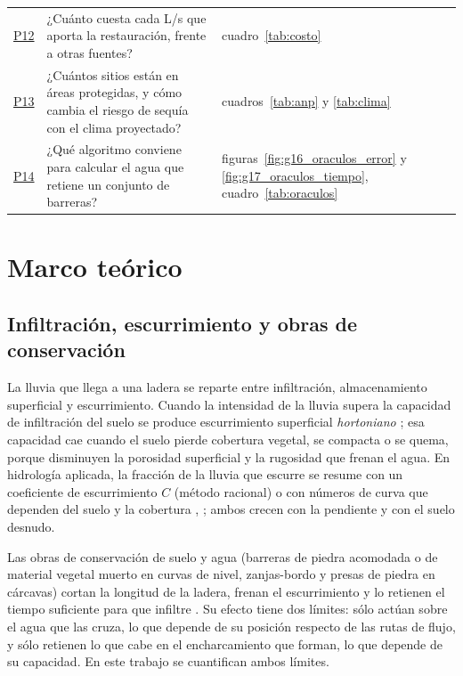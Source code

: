 \begin{table}[H]
\begin{tabularx}{\linewidth}{lXl}
\hyperref[res:p12]{P12} & ¿Cuánto cuesta cada L/s que aporta la restauración, frente a otras fuentes? & cuadro~\ref{tab:costo} \\
\hyperref[res:p13]{P13} & ¿Cuántos sitios están en áreas protegidas, y cómo cambia el riesgo de sequía con el clima proyectado? & cuadros~\ref{tab:anp} y \ref{tab:clima} \\
\hyperref[res:p14]{P14} & ¿Qué algoritmo conviene para calcular el agua que retiene un conjunto de barreras? & figuras~\ref{fig:g16_oraculos_error} y \ref{fig:g17_oraculos_tiempo}, cuadro~\ref{tab:oraculos} \\
\bottomrule
\end{tabularx}
\end{table}

\section{Marco teórico}

\subsection{Infiltración, escurrimiento y obras de conservación}

La lluvia que llega a una ladera se reparte entre infiltración, almacenamiento superficial y escurrimiento. Cuando la intensidad de la lluvia supera la capacidad de infiltración del suelo se produce escurrimiento superficial \emph{hortoniano} ; esa capacidad cae cuando el suelo pierde cobertura vegetal, se compacta o se quema, porque disminuyen la porosidad superficial y la rugosidad que frenan el agua. En hidrología aplicada, la fracción de la lluvia que escurre se resume con un coeficiente de escurrimiento $C$ (método racional) o con números de curva que dependen del suelo y la cobertura , ; ambos crecen con la pendiente y con el suelo desnudo.

Las obras de conservación de suelo y agua (barreras de piedra acomodada o de material vegetal muerto en curvas de nivel, zanjas-bordo y presas de piedra en cárcavas) cortan la longitud de la ladera, frenan el escurrimiento y lo retienen el tiempo suficiente para que infiltre . Su efecto tiene dos límites: sólo actúan sobre el agua que las cruza, lo que depende de su posición respecto de las rutas de flujo, y sólo retienen lo que cabe en el encharcamiento que forman, lo que depende de su capacidad. En este trabajo se cuantifican ambos límites.

